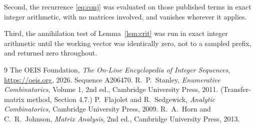 \documentclass[11pt,a4paper]{article}
\theoremstyle{plain}
\theoremstyle{definition}
\begin{document}
Second, the recurrence \eqref{eq:conj} was evaluated on those published terms in exact
integer arithmetic, with no matrices involved, and vanishes wherever it applies.

Third, the annihilation test of Lemma~\ref{lem:crit} was run in exact integer arithmetic
until the working vector was identically zero, not to a sampled prefix, and returned zero
throughout.

\begin{thebibliography}{9}
 The OEIS Foundation, \emph{The On-Line Encyclopedia of Integer
Sequences}, \url{https://oeis.org}, 2026. Sequence A206470.
 R.~P.~Stanley, \emph{Enumerative Combinatorics}, Volume 1, 2nd ed.,
Cambridge University Press, 2011. (Transfer-matrix method, Section 4.7.)
 P.~Flajolet and R.~Sedgewick, \emph{Analytic Combinatorics}, Cambridge
University Press, 2009.
 R.~A.~Horn and C.~R.~Johnson, \emph{Matrix Analysis}, 2nd ed., Cambridge
University Press, 2013.
\end{thebibliography}
\end{document}
